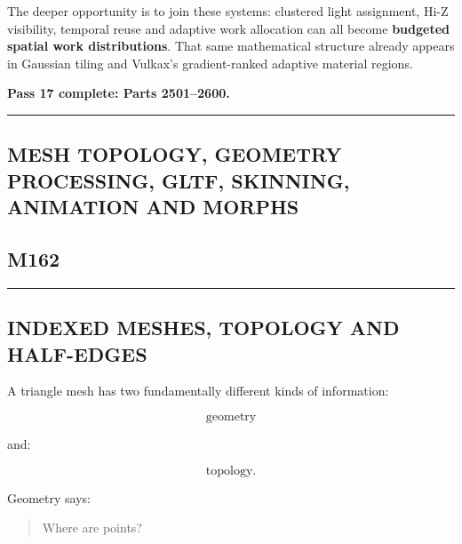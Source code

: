 The deeper opportunity is to join these systems: clustered light assignment, Hi-Z visibility, temporal reuse and adaptive work allocation can all become \textbf{budgeted spatial work distributions}. That same mathematical structure already appears in Gaussian tiling and Vulkax's gradient-ranked adaptive material regions.

\textbf{Pass 17 complete: Parts 2501--2600.}

\begin{center}\rule{0.5\linewidth}{0.5pt}\end{center}

\subsection{MESH TOPOLOGY, GEOMETRY PROCESSING, GLTF, SKINNING, ANIMATION AND MORPHS}\label{04-visual-computing-ii-ch040-mesh-topology-geometry-processing-gltf-skinning-animation-and-morphs}

\hypertarget{04-visual-computing-ii-ch040-mesh-topology-geometry-processing-gltf-skinning-animation-and-morphs}{}

\subsection{M162}\label{04-visual-computing-ii-ch040-m162}

\hypertarget{04-visual-computing-ii-ch040-m162}{}

\begin{center}\rule{0.5\linewidth}{0.5pt}\end{center}

\subsection{INDEXED MESHES, TOPOLOGY AND HALF-EDGES}\label{04-visual-computing-ii-ch040-indexed-meshes-topology-and-half-edges}

\hypertarget{04-visual-computing-ii-ch040-indexed-meshes-topology-and-half-edges}{}

A triangle mesh has two fundamentally different kinds of information:

\[
\boxed{
\text{geometry}
}
\]

and:

\[
\boxed{
\text{topology}.
}
\]

Geometry says:

\begin{quote}
Where are points?
\end{quote}

